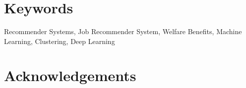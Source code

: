 \documentclass[10pt, sigconf, format=acmsmall, screen=true, review=false]{acmart}
\begin{document}
\section*{Keywords}
Recommender Systems, Job Recommender System, Welfare Benefits, Machine Learning, Clustering, Deep Learning










\section*{Acknowledgements}




\pagebreak
\onecolumn
\appendix




%
 
\end{document}
